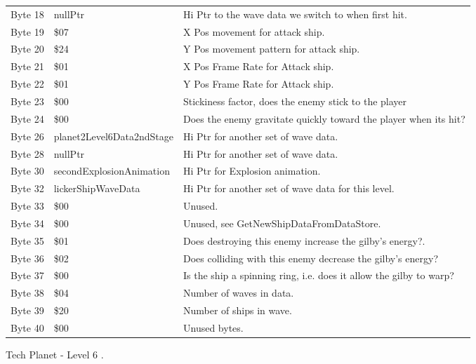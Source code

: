 \begin{figure}[H]
{\begin{adjustbox}{width=12cm}
\begin{tabular}{lll}
 Byte 18 & nullPtr                   & Hi Ptr to the wave data we switch to when first hit.               \\
 Byte 19 & \$07                       & X Pos movement for attack ship.                                    \\
 Byte 20 & \$24                       & Y Pos movement pattern for attack ship.                            \\
 Byte 21 & \$01                       & X Pos Frame Rate for Attack ship.                                  \\
 Byte 22 & \$01                       & Y Pos Frame Rate for Attack ship.                                  \\
 Byte 23 & \$00                       & Stickiness factor, does the enemy stick to the player              \\
 Byte 24 & \$00                       & Does the enemy gravitate quickly toward the player when its hit?   \\
 Byte 26 & planet2Level6Data2ndStage & Hi Ptr for another set of wave data.                               \\
 Byte 28 & nullPtr                   & Hi Ptr for another set of wave data.                               \\
 Byte 30 & secondExplosionAnimation  & Hi Ptr for Explosion animation.                                    \\
 Byte 32 & lickerShipWaveData        & Hi Ptr for another set of wave data for this level.                \\
 Byte 33 & \$00                       & Unused.                                                            \\
 Byte 34 & \$00                       & Unused, see GetNewShipDataFromDataStore.                           \\
 Byte 35 & \$01                       & Does destroying this enemy increase the gilby's energy?.           \\
 Byte 36 & \$02                       & Does colliding with this enemy decrease the gilby's energy?        \\
 Byte 37 & \$00                       & Is the ship a spinning ring, i.e. does it allow the gilby to warp? \\
 Byte 38 & \$04                       & Number of waves in data.                                           \\
 Byte 39 & \$20                       & Number of ships in wave.                                           \\
 Byte 40 & \$00                       & Unused bytes.                                                      \\
\bottomrule
\end{tabular}

  \end{adjustbox}

  }\caption*{Tech Planet - Level 6
.}
\end{figure}


